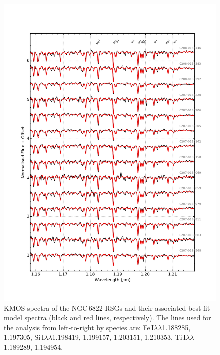 \documentclass[useAMS,usenatbib]{mn2e}
\begin{document}
\begin{figure}
 \begin{center}
\includegraphics[width=16cm]{NGC2100-model-fits}
\caption{KMOS spectra of the NGC\,6822 RSGs and their associated best-fit model spectra
(black and red lines, respectively).
The lines used for the analysis from left-to-right by species are:
Fe\,I$\lambda\lambda$1.188285,
1.197305,
Si\,I$\lambda\lambda$1.198419,
1.199157,
1.203151,
1.210353,
Ti\,I$\lambda\lambda$1.189289,
1.194954.
         }
\label{fig:model_fits}
\end{center}
\end{figure}
\end{document}
